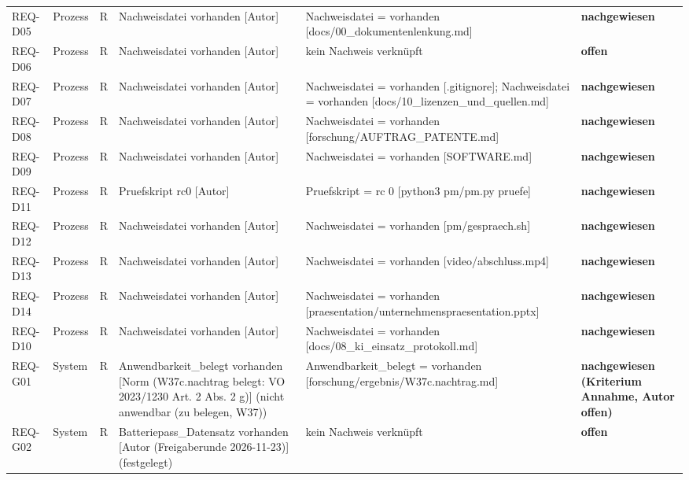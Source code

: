 \begin{longtable}{p{1.7cm}p{1.6cm}p{1.2cm}p{3.2cm}p{4.8cm}p{2.6cm}}
REQ-D05 & Prozess & R & Nachweisdatei vorhanden [Autor] & Nachweisdatei = vorhanden [docs/00\_dokumentenlenkung.md] & \textbf{nachgewiesen}\\
REQ-D06 & Prozess & R & Nachweisdatei vorhanden [Autor] & kein Nachweis verknüpft & \textbf{offen}\\
REQ-D07 & Prozess & R & Nachweisdatei vorhanden [Autor] & Nachweisdatei = vorhanden [.gitignore]; Nachweisdatei = vorhanden [docs/10\_lizenzen\_und\_quellen.md] & \textbf{nachgewiesen}\\
REQ-D08 & Prozess & R & Nachweisdatei vorhanden [Autor] & Nachweisdatei = vorhanden [forschung/AUFTRAG\_PATENTE.md] & \textbf{nachgewiesen}\\
REQ-D09 & Prozess & R & Nachweisdatei vorhanden [Autor] & Nachweisdatei = vorhanden [SOFTWARE.md] & \textbf{nachgewiesen}\\
REQ-D11 & Prozess & R & Pruefskript rc0 [Autor] & Pruefskript = rc 0 [python3 pm/pm.py pruefe] & \textbf{nachgewiesen}\\
REQ-D12 & Prozess & R & Nachweisdatei vorhanden [Autor] & Nachweisdatei = vorhanden [pm/gespraech.sh] & \textbf{nachgewiesen}\\
REQ-D13 & Prozess & R & Nachweisdatei vorhanden [Autor] & Nachweisdatei = vorhanden [video/abschluss.mp4] & \textbf{nachgewiesen}\\
REQ-D14 & Prozess & R & Nachweisdatei vorhanden [Autor] & Nachweisdatei = vorhanden [praesentation/unternehmenspraesentation.pptx] & \textbf{nachgewiesen}\\
REQ-D10 & Prozess & R & Nachweisdatei vorhanden [Autor] & Nachweisdatei = vorhanden [docs/08\_ki\_einsatz\_protokoll.md] & \textbf{nachgewiesen}\\
REQ-G01 & System & R & Anwendbarkeit\_belegt vorhanden [Norm (W37c.nachtrag belegt: VO 2023/1230 Art. 2 Abs. 2 g)] (nicht anwendbar (zu belegen, W37)) & Anwendbarkeit\_belegt = vorhanden [forschung/ergebnis/W37c.nachtrag.md] & \textbf{nachgewiesen (Kriterium Annahme, Autor offen)}\\
REQ-G02 & System & R & Batteriepass\_Datensatz vorhanden [Autor (Freigaberunde 2026-11-23)] (festgelegt) & kein Nachweis verknüpft & \textbf{offen}\\
\end{longtable}
